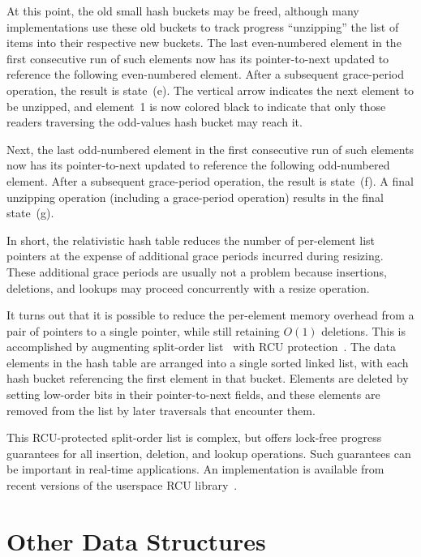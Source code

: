 At this point, the old small hash buckets may be freed, although many
implementations use these old buckets to track progress ``unzipping''
the list of items into their respective new buckets.
The last even-numbered element in the first consecutive run of such
elements now has its pointer-to-next updated to reference the following
even-numbered element.
After a subsequent grace-period operation, the result is state~(e).
The vertical arrow indicates the next element to be unzipped, and
element~1 is now colored black to indicate that only those readers traversing
the odd-values hash bucket may reach it.

Next, the last odd-numbered element in the first consecutive run of such
elements now has its pointer-to-next updated to reference the following
odd-numbered element.
After a subsequent grace-period operation, the result is state~(f).
A final unzipping operation (including a grace-period operation)
results in the final state~(g).

In short, the relativistic hash table reduces the number of per-element
list pointers at the expense of additional grace periods incurred during
resizing.
These additional grace periods are usually not a problem because
insertions, deletions, and lookups may proceed concurrently with
a resize operation.

It turns out that it is possible to reduce the per-element memory overhead
from a pair of pointers to a single pointer, while still retaining
$O(1)$ deletions.
This is accomplished by augmenting split-order
list~\cite{OriShalev2006SplitOrderListHash}
with RCU
protection~\cite{MathieuDesnoyers2009URCU,PaulMcKenney2013LWNURCUhash}.
The data elements in the hash table are arranged into a single
sorted linked list, with each hash bucket referencing the first element
in that bucket.
Elements are deleted by setting low-order bits in their pointer-to-next
fields, and these elements are removed from the list by later traversals
that encounter them.

This RCU-protected split-order list is complex, but offers lock-free
progress guarantees for all insertion, deletion, and lookup operations.
Such guarantees can be important in real-time applications.
An implementation is available from recent versions of the userspace RCU
library~\cite{MathieuDesnoyers2009URCU}.

\section{Other Data Structures}
\label{sec:datastruct:Other Data Structures}

